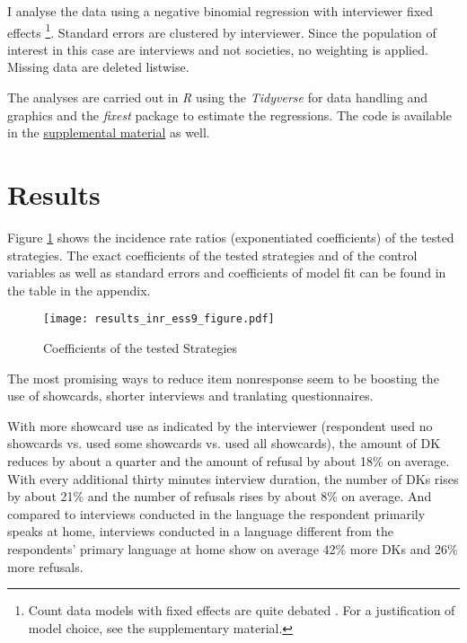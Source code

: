 \documentclass[a4paper,12pt]{article}
\begin{document}
I analyse the data using a negative binomial regression with interviewer fixed effects \citep{allisonFixedEffectsNegativeBinomial2002}\footnote{Count data models with fixed effects are quite debated \citep{wooldridgeDistributionfreeEstimationNonlinear1999, allisonFixedEffectsNegativeBinomial2002, cameronRegressionAnalysisCount2013}. For a justification of model choice, see the supplementary material.}. Standard errors are clustered by interviewer. Since the population of interest in this case are interviews and not societies, no weighting is applied. Missing data are deleted listwise.

The analyses are carried out in \textit{R} \citep{rcoreteamLanguageEnvironmentStatistical2021} using the \textit{Tidyverse} \citep{wickhamWelcomeTidyverse2019} for data handling and graphics and the \textit{fixest} package \citep{bergeEfficientEstimationMaximum2018} to estimate the regressions. The code is available  in the \href{https://doi.org/10.17605/OSF.IO/M83GY
}{supplemental material} as well.

\section{Results}

Figure \ref{fig_model} shows the incidence rate ratios (exponentiated coefficients) of the tested strategies. The exact coefficients of the tested strategies and of the control variables as well as standard errors and coefficients of model fit can be found in the table in the appendix.

\begin{figure}
\centering
\caption{Coefficients of the tested Strategies}
\texttt{[image: results\_inr\_ess9\_figure.pdf]}
\label{fig_model}
\end{figure}

The most promising ways to reduce item nonresponse seem to be boosting the use of showcards, shorter interviews and tranlating questionnaires.

With more showcard use as indicated by the interviewer (respondent used no showcards vs. used some showcards vs. used all showcards), the amount of DK reduces by about a quarter and the amount of refusal by about 18\% on average. With every additional thirty minutes interview duration, the number of DKs rises by about 21\% and the number of refusals rises by about 8\% on average. And compared to interviews conducted in the language the respondent primarily speaks at home, interviews conducted in a language different from the respondents' primary language at home show on average 42\% more DKs and 26\% more refusals.
\end{document}
